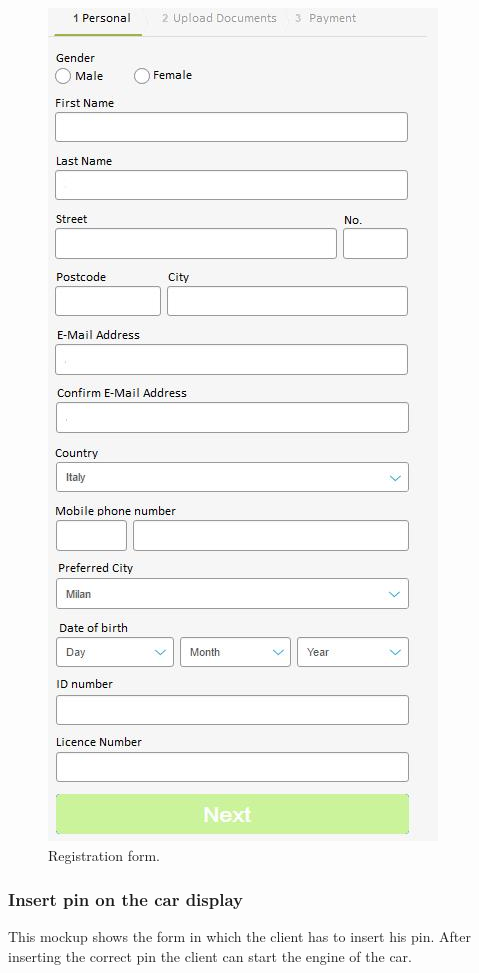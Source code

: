 \begin{figure}[hp]
\centering
\includegraphics[height=525 pt]{resources/registrazione.jpg}
\caption{\label{fig:reg}Registration form.}
\end{figure}

\newpage

\subsubsection*{Insert pin on the car display} This mockup shows the form in which the client has to insert his pin. After inserting the correct pin the client can start the engine of the car.


